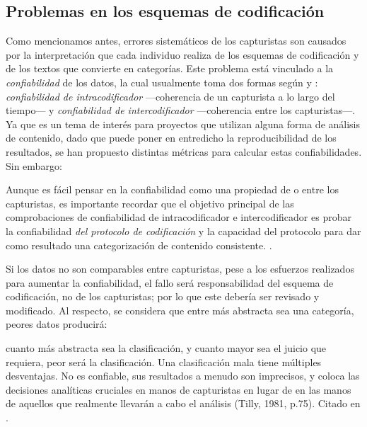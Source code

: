 \documentclass[letterpaper, 11pt]{book}
\theoremstyle{definition}
\theoremstyle{remark}
\begin{document}
\subsection{Problemas en los esquemas de codificación}
\label{sec:esquemas_de_codificacion}

Como mencionamos antes, errores sistemáticos de los capturistas son causados por la interpretación que cada individuo realiza de los esquemas de codificación y de los textos que convierte en categorías. 
Este problema está vinculado a la \emph{confiabilidad} de los datos, la cual usualmente toma dos formas según \citet{2015_Lacy_BestContentAnalysis} y \citet{2002_Koopmans_AEP}: \emph{confiabilidad de intracodificador} ---coherencia de un capturista a lo largo del tiempo--- y \emph{confiabilidad de intercodificador} ---coherencia entre los capturistas---. 
Ya que es un tema de interés para proyectos que utilizan alguna forma de análisis de contenido, dado que puede poner en entredicho la reproducibilidad de los resultados, se han propuesto distintas métricas para calcular estas confiabilidades. 
Sin embargo: 

\begin{center}
    \begin{minipage}{0.9\linewidth}
        {\setlength{\parindent}{12pt}\small
        Aunque es fácil pensar en la confiabilidad como una propiedad de o entre los capturistas, es importante recordar que el objetivo principal de las comprobaciones de confiabilidad de intracodificador e intercodificador es probar la confiabilidad \emph{del protocolo de codificación} y la capacidad del protocolo para dar como resultado una categorización de contenido consistente. \normalsize \citep[10]{2015_Lacy_BestContentAnalysis}.
        }
    \end{minipage}
\end{center}


Si los datos no son comparables entre capturistas, pese a los esfuerzos realizados para aumentar la confiabilidad, el fallo será responsabilidad del esquema de codificación, no de los capturistas; por lo que este debería ser revisado y modificado. Al respecto, se considera que entre más abstracta sea una categoría, peores datos producirá:

\begin{center}
    \begin{minipage}{0.9\linewidth}
        {\setlength{\parindent}{12pt}\small
        cuanto más abstracta sea la clasificación, y cuanto mayor sea el juicio que requiera, peor será la clasificación. 
        Una clasificación mala tiene múltiples desventajas. 
        No es confiable, sus resultados a menudo son imprecisos, y coloca las decisiones analíticas cruciales en manos de capturistas en lugar de en las manos de aquellos que realmente llevarán a cabo el análisis (Tilly, 1981, p.75). \normalsize Citado en \citep[145]{2003_Wada_Tesis}.
        }
    \end{minipage}
\end{center}
\end{document}
